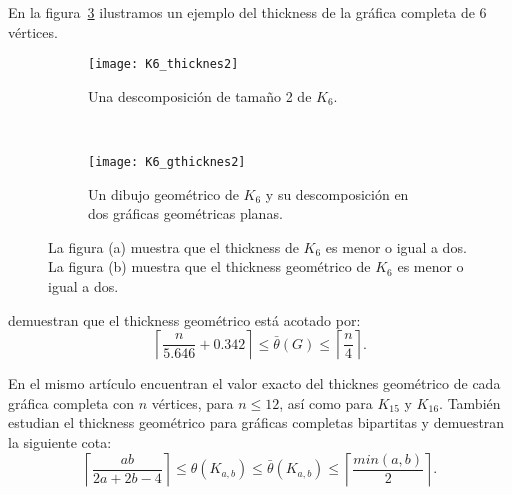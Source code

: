 En la figura~\ref{fig:thicknessexample} ilustramos un ejemplo del thickness de
la gráfica completa de 6 vértices.
\begin{figure}[htb]
  \centering
\begin{subfigure}[h]{.5\textwidth}
  \centering
  \texttt{[image: K6\_thicknes2]}
  \caption{Una descomposición de tamaño 2 de $K_6$.}
  \label{fig:thk6}
\end{subfigure}%
\\
\begin{subfigure}[h]{.5\textwidth}
  \centering
  \texttt{[image: K6\_gthicknes2]}
  \caption{Un dibujo geométrico de $K_6$ y su descomposición
  en dos gráficas geométricas planas.}
  \label{fig:gthk6}
\end{subfigure}
\caption{La figura (a) muestra que el thickness de $K_6$ es menor o igual a dos. La figura (b) muestra que el thickness geométrico de $K_6$ es menor o igual a dos.}
\label{fig:thicknessexample}
\end{figure}




\cite{Dillencourt2004} demuestran que el thickness geométrico está acotado por:
\[ \left\lceil \frac{n}{5.646} + 0.342 \right\rceil \leq  \bar{\theta}(G) \leq \left\lceil\frac{n}{4}\right\rceil .\]

En el mismo artículo encuentran el valor exacto del thicknes geométrico
de cada gráfica completa con $n$ vértices, para $n\leq 12$, así como para $K_{15}$ y $K_{16}$.
También estudian el thickness geométrico para gráficas completas bipartitas y demuestran la
siguiente cota:
\[
  \left\lceil \frac{ab}{2a+2b-4} \right\rceil \leq \theta(K_{a,b}) \leq \bar{\theta}(K_{a,b})
  \leq \left\lceil \frac{min(a,b)}{2} \right\rceil.
\]

